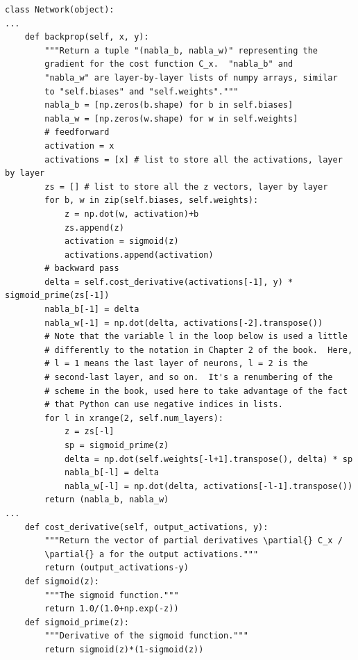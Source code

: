 \documentclass[a4paper,twoside,10pt]{book}
\begin{document}
\begin{lstlisting}
class Network(object):
...
	def backprop(self, x, y):
		"""Return a tuple "(nabla_b, nabla_w)" representing the
		gradient for the cost function C_x.  "nabla_b" and
		"nabla_w" are layer-by-layer lists of numpy arrays, similar
		to "self.biases" and "self.weights"."""
		nabla_b = [np.zeros(b.shape) for b in self.biases]
		nabla_w = [np.zeros(w.shape) for w in self.weights]
		# feedforward
		activation = x
		activations = [x] # list to store all the activations, layer by layer
		zs = [] # list to store all the z vectors, layer by layer
		for b, w in zip(self.biases, self.weights):
			z = np.dot(w, activation)+b
			zs.append(z)
			activation = sigmoid(z)
			activations.append(activation)
		# backward pass
		delta = self.cost_derivative(activations[-1], y) * sigmoid_prime(zs[-1])
		nabla_b[-1] = delta
		nabla_w[-1] = np.dot(delta, activations[-2].transpose())
		# Note that the variable l in the loop below is used a little
		# differently to the notation in Chapter 2 of the book.  Here,
		# l = 1 means the last layer of neurons, l = 2 is the
		# second-last layer, and so on.  It's a renumbering of the
		# scheme in the book, used here to take advantage of the fact
		# that Python can use negative indices in lists.
		for l in xrange(2, self.num_layers):
			z = zs[-l]
			sp = sigmoid_prime(z)
			delta = np.dot(self.weights[-l+1].transpose(), delta) * sp
			nabla_b[-l] = delta
			nabla_w[-l] = np.dot(delta, activations[-l-1].transpose())
		return (nabla_b, nabla_w)
...
	def cost_derivative(self, output_activations, y):
		"""Return the vector of partial derivatives \partial{} C_x /
		\partial{} a for the output activations."""
		return (output_activations-y) 
	def sigmoid(z):
		"""The sigmoid function."""
		return 1.0/(1.0+np.exp(-z))
	def sigmoid_prime(z):
		"""Derivative of the sigmoid function."""
		return sigmoid(z)*(1-sigmoid(z))
\end{lstlisting}
\end{document}
